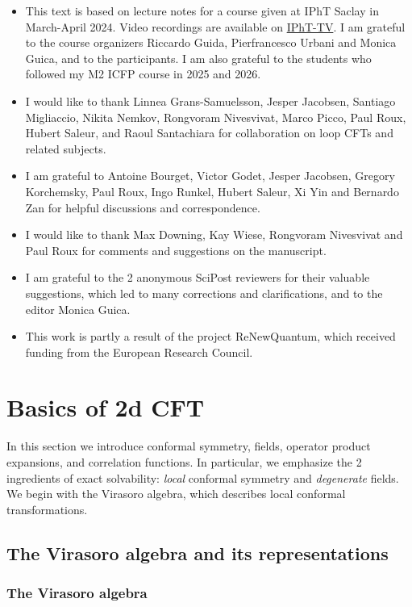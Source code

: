 \documentclass[12pt, a4paper]{article}
\begin{document}
\begin{itemize}
 \item This text is based on lecture notes for a course given at IPhT Saclay in March-April 2024. Video recordings are available on \href{https://www.youtube.com/playlist?list=PLrLctLPAdPNtD7yFOcfdNx2J-A_CE1svr}{IPhT-TV}. I am grateful to the course organizers Riccardo Guida, Pierfrancesco Urbani and Monica Guica, and to the participants. I am also grateful to the students who followed my M2 ICFP course in 2025 and 2026.
 \item I would like to thank Linnea Grans-Samuelsson, Jesper Jacobsen, Santiago Migliaccio, Nikita Nemkov, Rongvoram Nivesvivat, Marco Picco, Paul Roux, Hubert Saleur, and Raoul Santachiara for collaboration on loop CFTs and related subjects. 
 \item I am grateful to Antoine Bourget, Victor Godet, Jesper Jacobsen, Gregory Korchemsky, Paul Roux, Ingo Runkel, Hubert Saleur, Xi Yin and Bernardo Zan for helpful discussions and correspondence.
 \item I would like to thank Max Downing, Kay Wiese, Rongvoram Nivesvivat and Paul Roux for comments and suggestions on the manuscript. 
 \item I am grateful to the 2 anonymous SciPost reviewers for their valuable suggestions, which led to many corrections and clarifications, and to the editor Monica Guica.
 \item This work is partly a result of the project ReNewQuantum, which received funding from the European Research Council.
\end{itemize}

\section{Basics of 2d CFT}\label{sec:bo}

In this section we introduce conformal symmetry, fields, operator product expansions, and correlation functions. In particular, we emphasize the 2 ingredients of exact solvability: \textit{local} conformal symmetry and \textit{degenerate} fields. We begin with the Virasoro algebra, which describes local conformal transformations. 

\subsection{The Virasoro algebra and its representations}\label{sec:vir}

\subsubsection{The Virasoro algebra}
\end{document}
